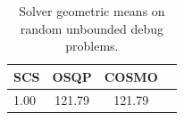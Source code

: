 \begin{table}
\centering
\caption{Solver geometric means on random unbounded debug problems.}
\label{t-random unbounded debug-geom_mean}
\begin{tabular}{lccc}
\toprule
 SCS &   OSQP &  COSMO \\
\midrule
1.00 & 121.79 & 121.79 \\
\bottomrule
\end{tabular}
\end{table}
